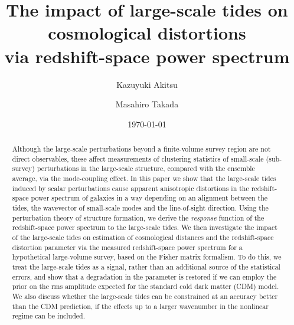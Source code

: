 \documentclass[prd,onecolumn,notitlepage,amsmath,amssymb,floatfix,superscriptaddress]{revtex4-1}
\begin{document}
\title[]{The impact of large-scale tides on cosmological distortions \\
via redshift-space power spectrum}

\author{Kazuyuki Akitsu}
\author{Masahiro Takada}

\date{\today}

\begin{abstract}
Although the large-scale perturbations beyond a finite-volume survey region are not direct observables, these affect measurements of 
clustering 
statistics of small-scale (sub-survey) perturbations in the large-scale structure, compared with the ensemble average,  
via the mode-coupling effect.
In this paper we show that the large-scale tides induced by scalar perturbations cause apparent anisotropic distortions in the redshift-space power spectrum of galaxies in a 
way depending on an alignment between the tides, the wavevector of small-scale modes and the line-of-sight direction.
Using the perturbation theory of structure formation, 
we derive the {\em response} function of the redshift-space power spectrum to the large-scale tides.
We then investigate the impact of the large-scale tides on estimation of cosmological distances and the
redshift-space distortion parameter via the measured redshift-space power spectrum for a hypothetical large-volume 
survey, based on the Fisher matrix formalism.
To do this, we treat the large-scale tides as a signal, 
rather than an additional source of the statistical errors, and show that a degradation in the parameter is restored if we can employ the prior on the rms amplitude
expected for the standard cold dark matter (CDM) model. 
We also discuss whether the large-scale tides can be constrained at an accuracy better than the CDM prediction, 
if the effects 
up to a larger wavenumber in the nonlinear regime can be included.
\end{abstract}
\end{document}
